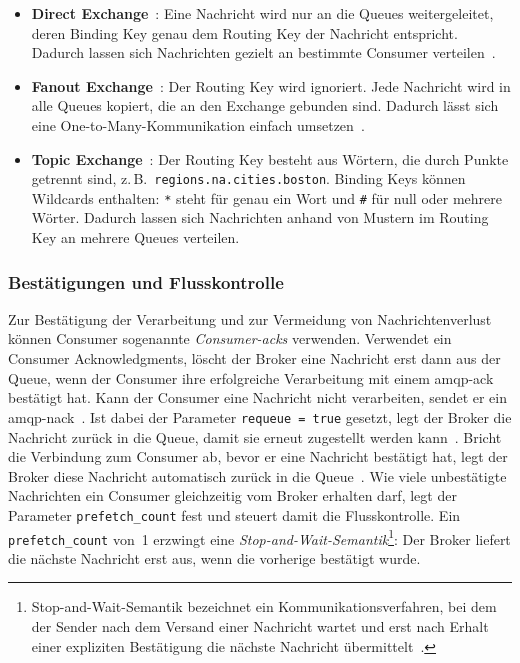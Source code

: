 \begin{itemize}
    \item \textbf{Direct Exchange}~\citep{rabbitmq_exchange_direct}: Eine Nachricht wird nur an die Queues weitergeleitet, deren Binding Key genau dem Routing Key der Nachricht entspricht. Dadurch lassen sich Nachrichten gezielt an bestimmte Consumer verteilen~\citep{rabbitmq_tut_work_queues, eip_competing_consumers}.

    \item \textbf{Fanout Exchange}~\citep{rabbitmq_exchange_fanout}: Der Routing Key wird ignoriert. Jede Nachricht wird in alle Queues kopiert, die an den Exchange gebunden sind. Dadurch lässt sich eine One-to-Many-Kommunikation einfach umsetzen~\citep{rabbitmq_tut_pubsub}.

    \item \textbf{Topic Exchange}~\citep{rabbitmq_exchange_topic}: Der Routing Key besteht aus Wörtern, die durch Punkte getrennt sind, z.\,B.~\texttt{regions.na.cities.boston}. Binding Keys können Wildcards enthalten: \texttt{*} steht für genau ein Wort und \texttt{\#} für null oder mehrere Wörter. Dadurch lassen sich Nachrichten anhand von Mustern im Routing Key an mehrere Queues verteilen.
\end{itemize}

\subsubsection{Bestätigungen und Flusskontrolle}

Zur Bestätigung der Verarbeitung und zur Vermeidung von Nachrichtenverlust können Consumer sogenannte \textit{Consumer-\glspl{ack}} verwenden. Verwendet ein Consumer Acknowledgments, löscht der Broker eine Nachricht erst dann aus der Queue, wenn der Consumer ihre erfolgreiche Verarbeitung mit einem \gls{amqp}-\gls{ack} bestätigt hat. Kann der Consumer eine Nachricht nicht verarbeiten, sendet er ein \gls{amqp}-\gls{nack}~\citep{rabbitmq_confirms}. Ist dabei der Parameter \texttt{requeue = true} gesetzt, legt der Broker die Nachricht zurück in die Queue, damit sie erneut zugestellt werden kann~\citep{rabbitmq_confirms}. Bricht die Verbindung zum Consumer ab, bevor er eine Nachricht bestätigt hat, legt der Broker diese Nachricht automatisch zurück in die Queue~\citep{amqp091}. Wie viele unbestätigte Nachrichten ein Consumer gleichzeitig vom Broker erhalten darf, legt der Parameter \texttt{prefetch\_count} fest und steuert damit die Flusskontrolle. Ein \texttt{prefetch\_count} von~1 erzwingt eine \textit{Stop-and-Wait-Semantik}\footnote{Stop-and-Wait-Semantik bezeichnet ein Kommunikationsverfahren, bei dem der Sender nach dem Versand einer Nachricht wartet und erst nach Erhalt einer expliziten Bestätigung die nächste Nachricht übermittelt~\citep{tanenbaum2011computer}.}: Der Broker liefert die nächste Nachricht erst aus, wenn die vorherige bestätigt wurde.

